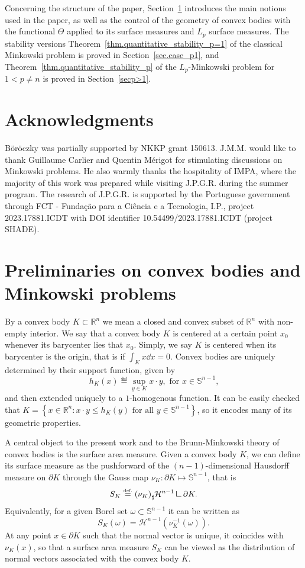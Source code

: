 \documentclass[a4paper, 10pt, twoside]{amsart}
\numberwithin{equation}{section}
\theoremstyle{plain}
\theoremstyle{definition}
\begin{document}
Concerning the structure of the paper, Section~\ref{sec.preliminaries} introduces the main notions used in the paper, as well as the control of the geometry of convex bodies with the functional $\Theta$ applied to its surface measures and $L_p$ surface measures. The stability versions Theorem~\ref{thm.quantitative_stability_p=1} of the classical Minkowski problem is proved in Section~\ref{sec.case_p1}, and Theorem~\ref{thm.quantitative_stability_p} of the $L_p$-Minkowski problem for $1< p \neq n$ is proved in Section~\ref{secp>1}.

\section*{Acknowledgments}
B\"or\"oczky was partially supported by NKKP grant 150613. J.M.M. would like to thank Guillaume Carlier and Quentin Mérigot for stimulating discussions on Minkowski problems. He also warmly thanks the hospitality of IMPA, where the majority of this work was prepared while visiting J.P.G.R. during the summer program. The research of J.P.G.R. is supported by the Portuguese government through FCT - Fundação para a Ciência e a Tecnologia, I.P., project 2023.17881.ICDT with DOI identifier 10.54499/2023.17881.ICDT (project SHADE). 

\section{Preliminaries on convex bodies and Minkowski problems}\label{sec.preliminaries}

By a convex body $K \subset \mathbb{R}^n$ we mean a closed and convex subset of $\mathbb{R}^n$ with non-empty interior. 
We say that a convex body $K$ is centered at a certain point $x_0$ whenever its barycenter lies that $x_0$. Simply, we say $K$ is centered when its barycenter is the origin, that is if $\displaystyle \int_K x \dd x = 0$. Convex bodies are uniquely determined by their support function, given by
\begin{equation}\label{eq.support_function}
    h_K(x) \eqdef \sup_{y \in K} x \cdot y, \text{ for $x \in \mathbb{S}^{n-1}$,}
\end{equation}
and then extended uniquely to a $1$-homogenous function. It can be easily checked that $K = \left\{ x \in \mathbb{R}^n: x\cdot y \le h_K(y) \text{ for all } y \in \mathbb{S}^{n-1} 
\right\}$, so it encodes many of its geometric properties.

A central object to the present work and to the Brunn-Minkowski theory of convex bodies is the surface area measure. Given a convex body $K$, we can define its surface measure as the pushforward of the $(n-1)$-dimensional Hausdorff measure on $\partial K$ through the Gauss map $\nu_K : \partial K \mapsto \mathbb{S}^{n-1}$, that is 
\[
    S_K \eqdef {(\nu_K)}_\sharp \mathcal{H}^{n-1}\mres \partial K. 
\]
Equivalently, for a given Borel set $\omega \subset \mathbb{S}^{n-1}$ it can be written as 
\[
    S_K(\omega) = \mathcal{H}^{n-1}(\nu_K^{-1}(\omega)). 
\] 
At any point $x\in\partial K$ such that the normal vector is unique, it coincides with $\nu_K(x)$, so that a surface area measure $S_K$ can be viewed as the distribution of normal vectors associated with the convex body $K$. 
\end{document}
